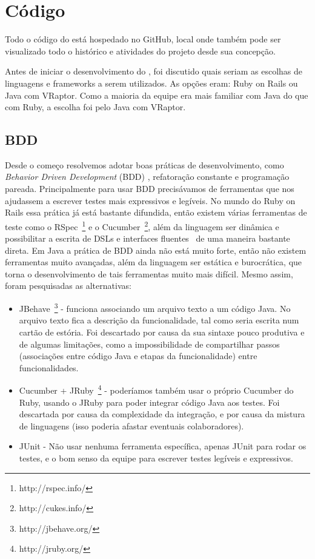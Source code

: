 \section{Código}
Todo o código do \calopsita está hospedado no GitHub, local onde também pode ser visualizado todo o histórico e atividades do projeto desde sua concepção.

Antes de iniciar o desenvolvimento do \calopsita, foi discutido quais seriam as escolhas de linguagens e frameworks a 
serem utilizados. As opções eram: Ruby on Rails ou Java com VRaptor. Como a maioria da equipe era mais familiar com Java 
do que com Ruby, a escolha foi pelo Java com VRaptor.

\subsection{BDD} \label{bdd}
Desde o começo resolvemos adotar boas práticas de desenvolvimento, como {\it Behavior Driven Development} (BDD) \cite{bdd}, 
refatoração constante e programação pareada. Principalmente para usar BDD precisávamos de ferramentas que nos 
ajudassem a escrever testes mais expressivos e legíveis. No mundo do Ruby on Rails essa prática já está bastante 
difundida, então existem várias ferramentas de teste como o RSpec~\footnote{http://rspec.info/} e o
Cucumber~\footnote{http://cukes.info/}, além da linguagem ser dinâmica e possibilitar a escrita de DSLs e interfaces
fluentes~\cite{dsl} de uma maneira bastante direta. Em Java a prática de BDD ainda não está muito forte, então não existem
ferramentas muito avançadas, além da linguagem ser estática e burocrática, que torna o desenvolvimento de tais ferramentas 
muito mais difícil. Mesmo assim, foram pesquisadas as alternativas:

\begin{itemize}
	\item{JBehave~\footnote{http://jbehave.org/} - funciona associando um arquivo texto a um código Java. No arquivo texto fica 
	a descrição da funcionalidade, tal como seria escrita num cartão de estória. Foi descartado por causa da sua sintaxe 
	pouco produtiva e de algumas limitações, como a impossibilidade de compartilhar passos (associações entre código Java 
	e etapas da funcionalidade) entre funcionalidades.}
	\item{Cucumber + JRuby~\footnote{http://jruby.org/} - poderíamos também usar o próprio Cucumber do Ruby, usando o JRuby 
	para poder integrar código 
Java aos testes. Foi descartada por causa da complexidade da integração, e por causa da mistura de linguagens 
(isso poderia afastar eventuais colaboradores).}
	\item{JUnit - Não usar nenhuma ferramenta específica, apenas JUnit para rodar os testes, e o bom senso da 
equipe para escrever testes legíveis e expressivos.}
\end{itemize}

